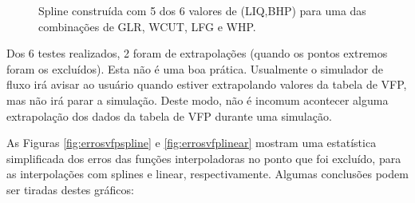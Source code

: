 \documentclass[final,5p]{elsarticle}
\numberwithin{equation}{section}
\begin{document}
        \begin{figure}[hbt!] 
            \caption{Spline construída com 5 dos 6 valores de (LIQ,BHP) para uma das combinações de GLR, WCUT, LFG e WHP.}
            \label{fig:exvfp}
        \end{figure}

                
        Dos 6 testes realizados, 2 foram de extrapolações (quando os pontos extremos foram os excluídos). Esta não é uma boa prática. Usualmente o simulador de fluxo irá avisar ao usuário quando estiver extrapolando valores da tabela de VFP, mas não irá parar a simulação. Deste modo, não é incomum acontecer alguma extrapolação dos dados da tabela de VFP durante uma simulação.
        
        As Figuras \ref{fig:errosvfpspline} e \ref{fig:errosvfplinear} mostram uma estatística simplificada dos erros das funções interpoladoras no ponto que foi excluído, para as interpolações com splines e linear, respectivamente. Algumas conclusões podem ser tiradas destes gráficos:
\end{document}

